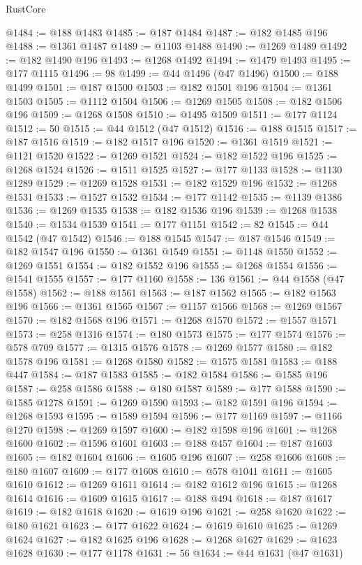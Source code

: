 \begin{lexlean}{RustCore}
\begin{coremodule}
@1484 := @188 @1483
@1485 := @187 @1484
@1487 := @182 @1485 @196
@1488 := @1361 @1487
@1489 := @1103 @1488
@1490 := @1269 @1489
@1492 := @182 @1490 @196
@1493 := @1268 @1492
@1494 := @1479 @1493
@1495 := @177 @1115
@1496 := 98
@1499 := @44 @1496 (@47 @1496)
@1500 := @188 @1499
@1501 := @187 @1500
@1503 := @182 @1501 @196
@1504 := @1361 @1503
@1505 := @1112 @1504
@1506 := @1269 @1505
@1508 := @182 @1506 @196
@1509 := @1268 @1508
@1510 := @1495 @1509
@1511 := @177 @1124
@1512 := 50
@1515 := @44 @1512 (@47 @1512)
@1516 := @188 @1515
@1517 := @187 @1516
@1519 := @182 @1517 @196
@1520 := @1361 @1519
@1521 := @1121 @1520
@1522 := @1269 @1521
@1524 := @182 @1522 @196
@1525 := @1268 @1524
@1526 := @1511 @1525
@1527 := @177 @1133
@1528 := @1130 @1289
@1529 := @1269 @1528
@1531 := @182 @1529 @196
@1532 := @1268 @1531
@1533 := @1527 @1532
@1534 := @177 @1142
@1535 := @1139 @1386
@1536 := @1269 @1535
@1538 := @182 @1536 @196
@1539 := @1268 @1538
@1540 := @1534 @1539
@1541 := @177 @1151
@1542 := 82
@1545 := @44 @1542 (@47 @1542)
@1546 := @188 @1545
@1547 := @187 @1546
@1549 := @182 @1547 @196
@1550 := @1361 @1549
@1551 := @1148 @1550
@1552 := @1269 @1551
@1554 := @182 @1552 @196
@1555 := @1268 @1554
@1556 := @1541 @1555
@1557 := @177 @1160
@1558 := 136
@1561 := @44 @1558 (@47 @1558)
@1562 := @188 @1561
@1563 := @187 @1562
@1565 := @182 @1563 @196
@1566 := @1361 @1565
@1567 := @1157 @1566
@1568 := @1269 @1567
@1570 := @182 @1568 @196
@1571 := @1268 @1570
@1572 := @1557 @1571
@1573 := @258 @1316
@1574 := @180 @1573
@1575 := @177 @1574
@1576 := @578 @709
@1577 := @1315 @1576
@1578 := @1269 @1577
@1580 := @182 @1578 @196
@1581 := @1268 @1580
@1582 := @1575 @1581
@1583 := @188 @447
@1584 := @187 @1583
@1585 := @182 @1584
@1586 := @1585 @196
@1587 := @258 @1586
@1588 := @180 @1587
@1589 := @177 @1588
@1590 := @1585 @1278
@1591 := @1269 @1590
@1593 := @182 @1591 @196
@1594 := @1268 @1593
@1595 := @1589 @1594
@1596 := @177 @1169
@1597 := @1166 @1270
@1598 := @1269 @1597
@1600 := @182 @1598 @196
@1601 := @1268 @1600
@1602 := @1596 @1601
@1603 := @188 @457
@1604 := @187 @1603
@1605 := @182 @1604
@1606 := @1605 @196
@1607 := @258 @1606
@1608 := @180 @1607
@1609 := @177 @1608
@1610 := @578 @1041
@1611 := @1605 @1610
@1612 := @1269 @1611
@1614 := @182 @1612 @196
@1615 := @1268 @1614
@1616 := @1609 @1615
@1617 := @188 @494
@1618 := @187 @1617
@1619 := @182 @1618
@1620 := @1619 @196
@1621 := @258 @1620
@1622 := @180 @1621
@1623 := @177 @1622
@1624 := @1619 @1610
@1625 := @1269 @1624
@1627 := @182 @1625 @196
@1628 := @1268 @1627
@1629 := @1623 @1628
@1630 := @177 @1178
@1631 := 56
@1634 := @44 @1631 (@47 @1631)

\end{coremodule}
\end{lexlean}
